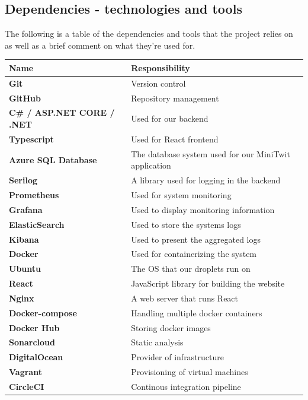 \subsection{Dependencies - technologies and tools}
The following is a table of the dependencies and tools that the project relies on as well as a brief comment on what they're used for.
\centering
\begin{tabularx}{\textwidth}{|X|l|}
 \hline
 \textbf{Name} & \textbf{Responsibility}  \\ [0.5ex] 
 \hline\hline
 \textbf{Git} & Version control  \\ 
 \hline
 \textbf{GitHub} & Repository management \\
 \hline
 \textbf{C\# / ASP.NET CORE / .NET} & Used for our backend \\
 \hline
 \textbf{Typescript} & Used for React frontend \\
 \hline
 \textbf{Azure SQL Database} & The database system used for our MiniTwit application\\ 
 \hline
 \textbf{Serilog} & A library used for logging in the backend \\
 \hline
 \textbf{Prometheus} & Used for system monitoring \\
 \hline
 \textbf{Grafana} & Used to display monitoring information\\
 \hline
 \textbf{ElasticSearch} & Used to store the systems logs \\
 \hline
 \textbf{Kibana} & Used to present the aggregated logs \\
 \hline
 \textbf{Docker} & Used for containerizing the system \\
 \hline
 \textbf{Ubuntu} & The OS that our droplets run on\\
 \hline
 \textbf{React} & JavaScript library for building the website \\
 \hline
 \textbf{Nginx} & A web server that runs React\\
 \hline
 \textbf{Docker-compose} & Handling multiple docker containers \\
 \hline
 \textbf{Docker Hub} & Storing docker images \\
 \hline
 \textbf{Sonarcloud} & Static analysis \\
 \hline
 \textbf{DigitalOcean} & Provider of infrastructure \\
 \hline
 \textbf{Vagrant} & Provisioning of virtual machines \\
 \hline
 \textbf{CircleCI} & Continous integration pipeline \\

\end{tabularx}
